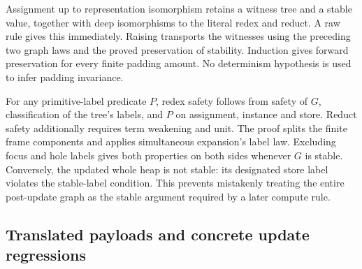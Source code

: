 


Assignment up to representation isomorphism retains a witness tree and a
stable value, together with deep isomorphisms to the literal redex and
reduct. A raw rule gives this immediately. Raising transports the witnesses
using the preceding two graph laws and the proved preservation of stability.
Induction gives forward preservation for every finite padding amount.
No determinism hypothesis is used to infer padding invariance.





For any primitive-label predicate $P$, redex safety follows from safety of
$G$, classification of the tree's labels, and $P$ on assignment, instance
and store. Reduct safety additionally requires term weakening and unit.
The proof splits the finite frame components and applies simultaneous
expansion's label law. Excluding focus and hole labels gives both properties
on both sides whenever $G$ is stable. Conversely, the updated whole heap
is not stable: its designated store label violates the stable-label
condition. This prevents mistakenly treating the entire post-update graph
as the stable argument required by a later compute rule.





\subsection{Translated payloads and concrete update regressions}

